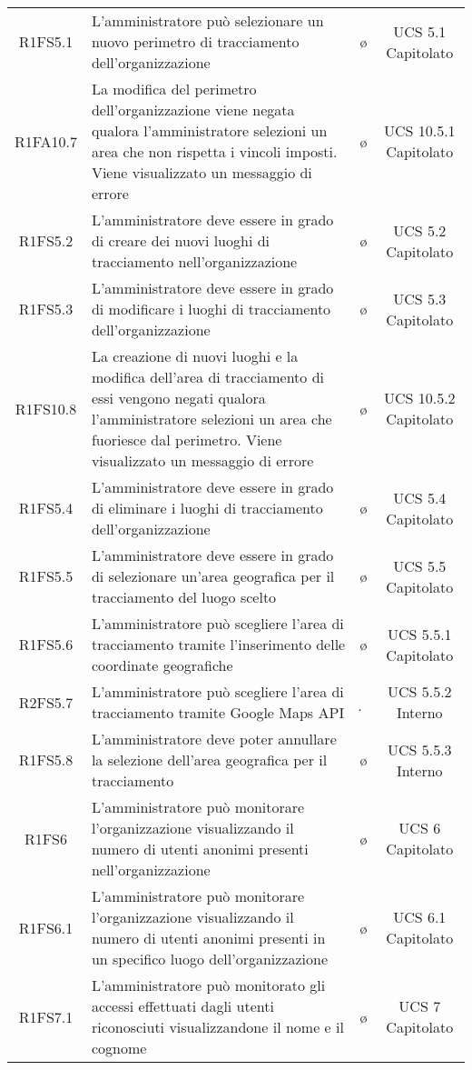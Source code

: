{\begin{longtable}{ c C{4cm} c c}
R1FS5.1 & L'amministratore può selezionare un nuovo perimetro di tracciamento dell'organizzazione & \o & UCS 5.1 Capitolato\\
R1FA10.7 & La modifica del perimetro dell'organizzazione viene negata qualora l'amministratore selezioni un area che non rispetta i vincoli imposti. Viene visualizzato un messaggio di errore & \o & UCS 10.5.1 Capitolato \\
R1FS5.2 & L'amministratore deve essere in grado di creare dei nuovi luoghi di tracciamento nell'organizzazione & \o & UCS 5.2 Capitolato\\
R1FS5.3 & L'amministratore deve essere in grado di modificare i luoghi di tracciamento dell'organizzazione  & \o & UCS 5.3 Capitolato\\
R1FS10.8 & La creazione di nuovi luoghi e la modifica dell'area di tracciamento di essi vengono negati qualora l'amministratore selezioni un area che fuoriesce dal perimetro. Viene visualizzato un messaggio di errore & \o & UCS 10.5.2 Capitolato \\
R1FS5.4 & L'amministratore deve essere in grado di eliminare i luoghi di tracciamento dell'organizzazione  & \o & UCS 5.4 Capitolato\\
R1FS5.5 & L'amministratore deve essere in grado di selezionare un'area geografica per il tracciamento del luogo scelto  & \o & UCS 5.5 Capitolato\\
R1FS5.6 &  L'amministratore può scegliere l'area di tracciamento tramite l'inserimento delle coordinate geografiche & \o & UCS 5.5.1 Capitolato\\
R2FS5.7 & L'amministratore può scegliere l'area di tracciamento tramite Google Maps API & \d & UCS 5.5.2 Interno\\
R1FS5.8 & L'amministratore deve poter annullare la selezione dell'area geografica per il tracciamento & \o & UCS 5.5.3 Interno\\
R1FS6 & L'amministratore può monitorare l'organizzazione visualizzando il numero di utenti anonimi presenti nell'organizzazione & \o & UCS 6 Capitolato\\
R1FS6.1 & L'amministratore può monitorare l'organizzazione visualizzando il numero di utenti anonimi presenti in un specifico luogo dell'organizzazione  & \o & UCS 6.1 Capitolato\\
R1FS7.1 & L'amministratore può monitorato gli accessi effettuati dagli utenti riconosciuti visualizzandone il nome e il cognome & \o & UCS 7 Capitolato\\

\end{longtable}}
